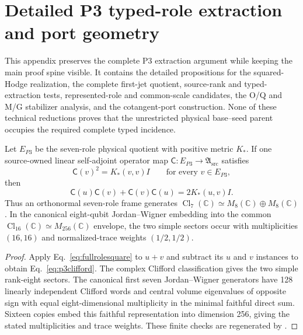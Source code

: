 \section{Detailed P3 typed-role extraction and port geometry}
\label{app:p3technical}

This appendix preserves the complete P3 extraction argument while keeping the
main proof spine visible. It contains the detailed propositions for the squared-Hodge
realization, the complete first-jet quotient, source-rank and typed-extraction
tests, represented-role and common-scale candidates, the O/Q and M/G
stabilizer analysis, and the cotangent-port construction.  None of these
technical reductions proves that the unrestricted physical base--seed parent
occupies the required complete typed incidence.

\begin{proposition}
\label{prop:p3clifford}
Let $E_{P3}$ be the seven-role physical quotient with positive metric $K_*$.
If one source-owned linear self-adjoint operator map
$\mathsf C:E_{P3}\to\mathfrak A_{\mathrm{src}}$ satisfies
\begin{equation}
\mathsf C(v)^2=K_*(v,v)I
\qquad\text{for every }v\in E_{P3},
\label{eq:fullrolesquare}
\end{equation}
then
\begin{equation}
\mathsf C(u)\mathsf C(v)+\mathsf C(v)\mathsf C(u)
=2K_*(u,v)I.
\label{eq:p3clifford}
\end{equation}
Thus an orthonormal seven-role frame generates
$\operatorname{Cl}_7(\mathbb C)\simeq
M_8(\mathbb C)\oplus M_8(\mathbb C)$.  In the canonical eight-qubit
Jordan--Wigner embedding into the common
$\operatorname{Cl}_{16}(\mathbb C)\simeq M_{256}(\mathbb C)$ envelope, the
two simple sectors occur with multiplicities $(16,16)$ and normalized-trace
weights $(1/2,1/2)$.
\end{proposition}

\begin{proof}
Apply Eq.~\eqref{eq:fullrolesquare} to $u+v$ and subtract its $u$ and $v$
instances to obtain Eq.~\eqref{eq:p3clifford}.  The complex Clifford
classification gives the two simple rank-eight sectors.  The canonical first
seven Jordan--Wigner generators have 128 linearly independent Clifford words
and central volume eigenvalues of opposite sign with equal eight-dimensional
multiplicity in the minimal faithful direct sum.  Sixteen copies embed this
faithful representation into dimension 256, giving the stated multiplicities
and trace weights.  These finite checks are regenerated by
.
\end{proof}

